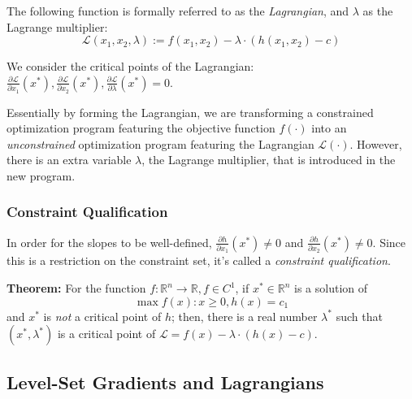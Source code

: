 \documentclass[11pt,]{article}
\begin{document}
The following function is formally referred to as the \emph{Lagrangian},
and \(\lambda\) as the Lagrange multiplier: \[
\mathcal{L}(x_1,x_2,\lambda) := f(x_1,x_2)-\lambda\cdot(h(x_1,x_2)-c)
\]

We consider the critical points of the Lagrangian:
\(\frac{\partial \mathcal{L}}{\partial x_1}(x^*), \frac{\partial \mathcal{L}}{\partial x_2}(x^*), \frac{\partial \mathcal{L}}{\partial \lambda}(x^*)=0\).

Essentially by forming the Lagrangian, we are transforming a constrained
optimization program featuring the objective function \(f(\cdot)\) into
an \emph{unconstrained} optimization program featuring the Lagrangian
\(\mathcal{L}(\cdot)\). However, there is an extra variable \(\lambda\),
the Lagrange multiplier, that is introduced in the new program.

\subsubsection{Constraint Qualification}\label{constraint-qualification}

In order for the slopes to be well-defined,
\(\frac{\partial h}{\partial x_1}(x^*)\neq 0\) and
\(\frac{\partial h}{\partial x_2}(x^*)\neq 0\). Since this is a
restriction on the constraint set, it's called a \emph{constraint
qualification}.

\textbf{Theorem:} For the function
\(f:\mathbb{R}^n\to \mathbb{R}, f\in C^1\), if \(x^*\in \mathbb{R}^n\)
is a solution of \[\max f(x): x\geq 0, h(x)=c_1\] and \(x^*\) is
\emph{not} a critical point of \(h\); then, there is a real number
\(\lambda^*\) such that \((x^*,\lambda^*)\) is a critical point of
\(\mathcal{L}=f(x)-\lambda\cdot(h(x)-c)\).

\subsection{Level-Set Gradients and
Lagrangians}\label{level-set-gradients-and-lagrangians}
\end{document}
